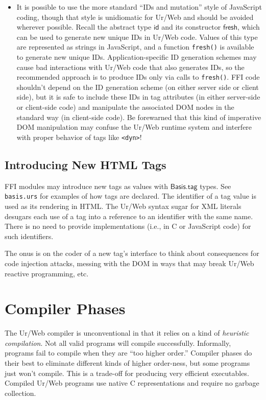 \documentclass{article}
\newcommand{\cd}[1]{\texttt{#1}}
\newcommand{\mt}[1]{\mathsf{#1}}
\begin{document}
\begin{itemize}
\item It is possible to use the more standard ``IDs and mutation'' style of JavaScript coding, though that style is unidiomatic for Ur/Web and should be avoided wherever possible.  Recall the abstract type $\mt{id}$ and its constructor $\mt{fresh}$, which can be used to generate new unique IDs in Ur/Web code.  Values of this type are represented as strings in JavaScript, and a function \cd{fresh()} is available to generate new unique IDs.  Application-specific ID generation schemes may cause bad interactions with Ur/Web code that also generates IDs, so the recommended approach is to produce IDs only via calls to \cd{fresh()}.  FFI code shouldn't depend on the ID generation scheme (on either server side or client side), but it is safe to include these IDs in tag attributes (in either server-side or client-side code) and manipulate the associated DOM nodes in the standard way (in client-side code).  Be forewarned that this kind of imperative DOM manipulation may confuse the Ur/Web runtime system and interfere with proper behavior of tags like \cd{<dyn>}!
\end{itemize}

\subsection{Introducing New HTML Tags}

FFI modules may introduce new tags as values with $\mt{Basis.tag}$ types.  See \texttt{basis.urs} for examples of how tags are declared.  The identifier of a tag value is used as its rendering in HTML.  The Ur/Web syntax sugar for XML literals desugars each use of a tag into a reference to an identifier with the same name.  There is no need to provide implementations (i.e., in C or JavaScript code) for such identifiers.

The onus is on the coder of a new tag's interface to think about consequences for code injection attacks, messing with the DOM in ways that may break Ur/Web reactive programming, etc.


\section{Compiler Phases}

The Ur/Web compiler is unconventional in that it relies on a kind of \emph{heuristic compilation}.  Not all valid programs will compile successfully.  Informally, programs fail to compile when they are ``too higher order.''  Compiler phases do their best to eliminate different kinds of higher order-ness, but some programs just won't compile.  This is a trade-off for producing very efficient executables.  Compiled Ur/Web programs use native C representations and require no garbage collection.
\end{document}
